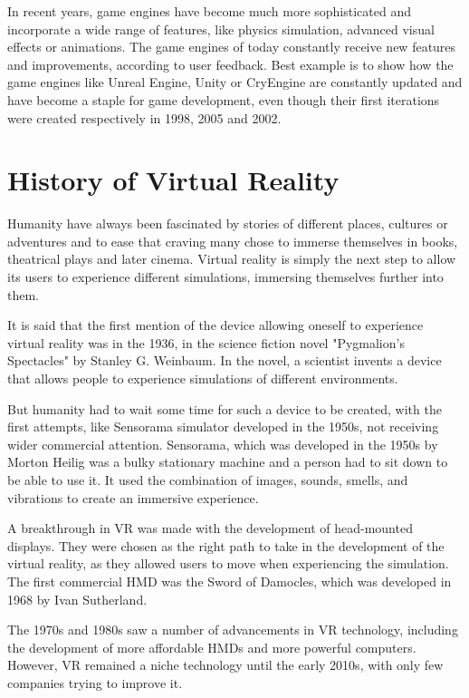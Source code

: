 In recent years, game engines have become much more sophisticated and incorporate a wide range of features, like physics simulation, advanced visual effects or animations. The game engines of today constantly receive new features and improvements, according to user feedback. Best example is to show how the game engines like Unreal Engine, Unity or CryEngine are constantly updated and have become a staple for game development, even though their first iterations were created respectively in 1998, 2005 and 2002.

\newpage
\section{History of Virtual Reality}
\label{sec:history_vr}
\hspace{\parindent}
Humanity have always been fascinated by stories of different places, cultures or adventures and to ease that craving many chose to immerse themselves in books, theatrical plays and later cinema. Virtual reality is simply the next step to allow its users to experience different simulations, immersing themselves further into them. 

It is said that the first mention of the device allowing oneself to experience virtual reality was in the 1936, in the science fiction novel "Pygmalion's Spectacles" by Stanley G. Weinbaum. In the novel, a scientist invents a device that allows people to experience simulations of different environments. 

But humanity had to wait some time for such a device to be created, with the first attempts, like Sensorama simulator developed in the 1950s, not receiving wider commercial attention. Sensorama, which was developed in the 1950s by Morton Heilig was a bulky stationary machine and a person had to sit down to be able to use it. It used the combination of images, sounds, smells, and vibrations to create an immersive experience.

A breakthrough in VR was made with the development of head-mounted displays. They were chosen as the right path to take in the development of the virtual reality, as they allowed users to move when experiencing the simulation. The first commercial HMD was the Sword of Damocles, which was developed in 1968 by Ivan Sutherland.

The 1970s and 1980s saw a number of advancements in VR technology, including the development of more affordable HMDs and more powerful computers. However, VR remained a niche technology until the early 2010s, with only few companies trying to improve it.

